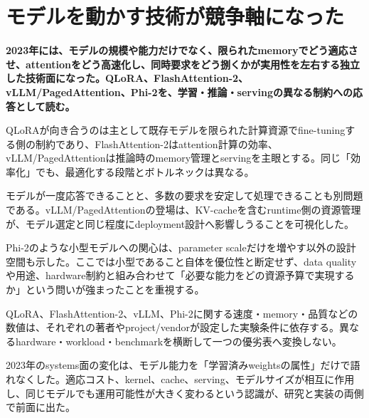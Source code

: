 \section{モデルを動かす技術が競争軸になった}
\label{pkg:runtime-adaptation}
\noindent\textbf{2023年には、モデルの規模や能力だけでなく、限られたmemoryでどう適応させ、attentionをどう高速化し、同時要求をどう捌くかが実用性を左右する独立した技術面になった。QLoRA、FlashAttention-2、vLLM/PagedAttention、Phi-2を、学習・推論・servingの異なる制約への応答として読む。}\autocite{src-1ab9d44a819a,src-5e1a3a4fc45b,src-6e61359d2fae,src-7f830e688335,src-e03b0ba5b24e,src-fb804ac849e4}

QLoRAが向き合うのは主として既存モデルを限られた計算資源でfine-tuningする側の制約であり、FlashAttention-2はattention計算の効率、vLLM/PagedAttentionは推論時のmemory管理とservingを主眼とする。同じ「効率化」でも、最適化する段階とボトルネックは異なる。\autocite{src-1ab9d44a819a,src-5e1a3a4fc45b,src-7f830e688335,src-e03b0ba5b24e,src-fb804ac849e4}


モデルが一度応答できることと、多数の要求を安定して処理できることも別問題である。vLLM/PagedAttentionの登場は、KV-cacheを含むruntime側の資源管理が、モデル選定と同じ程度にdeployment設計へ影響しうることを可視化した。\autocite{src-1ab9d44a819a,src-e03b0ba5b24e,src-fb804ac849e4}


Phi-2のような小型モデルへの関心は、parameter scaleだけを増やす以外の設計空間も示した。ここでは小型であること自体を優位性と断定せず、data qualityや用途、hardware制約と組み合わせて「必要な能力をどの資源予算で実現するか」という問いが強まったことを重視する。\autocite{src-6e61359d2fae}


\begin{claimboundary}
QLoRA、FlashAttention-2、vLLM、Phi-2に関する速度・memory・品質などの数値は、それぞれの著者やproject/vendorが設定した実験条件に依存する。異なるhardware・workload・benchmarkを横断して一つの優劣表へ変換しない。\autocite{src-1ab9d44a819a,src-5e1a3a4fc45b,src-6e61359d2fae,src-7f830e688335,src-e03b0ba5b24e,src-fb804ac849e4}
\end{claimboundary}

2023年のsystems面の変化は、モデル能力を「学習済みweightsの属性」だけで語れなくした。適応コスト、kernel、cache、serving、モデルサイズが相互に作用し、同じモデルでも運用可能性が大きく変わるという認識が、研究と実装の両側で前面に出た。\autocite{src-1ab9d44a819a,src-5e1a3a4fc45b,src-6e61359d2fae,src-7f830e688335,src-e03b0ba5b24e,src-fb804ac849e4}
